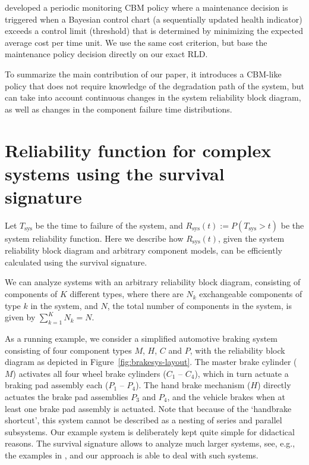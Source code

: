 \documentclass[authoryear]{elsarticle}
\newcommand{\Tsys}{T_\text{sys}}
\newcommand{\Rsys}{R_\text{sys}}
\def\tnow{t_\text{now}}
\newcommand{\Rsysnow}{R^{(t_\text{now})}_\text{sys}}
\begin{document}
\citet{2011:kim-et-al} developed a periodic monitoring CBM policy
where a maintenance decision is triggered when a Bayesian control chart
(a sequentially updated health indicator) exceeds a control limit (threshold)
that is determined by minimizing the expected average cost per time unit.
We use the same cost criterion, but base the maintenance policy decision directly on our exact RLD.

To summarize the main contribution of our paper,
it introduces a CBM-like policy that does not require knowledge of the degradation path of the system,
but can take into account continuous changes in the system reliability block diagram,
as well as changes in the component failure time distributions.



\section{Reliability function for complex systems using the survival signature}
\label{sec:sysrel}

Let $\Tsys$ be the time to failure of the system,
and $\Rsys(t) := P(\Tsys > t)$ be the system reliability function.
Here we describe how $\Rsys(t)$, given the system reliability block diagram and arbitrary component models,
can be efficiently calculated using the survival signature.

We can analyze systems with an arbitrary reliability block diagram,
consisting of components of $K$ different types,
where there are $N_k$ exchangeable components of type $k$ in the system,
and $N$, the total number of components in the system, is given by $\sum_{k=1}^K N_k = N$.

As a running example, we consider a simplified automotive braking system
consisting of four component types $M$, $H$, $C$ and $P$,
with the reliability block diagram as depicted in Figure~\ref{fig:brakesys-layout}.
The master brake cylinder ($M$) activates all four wheel brake cylinders ($C_1$ -- $C_4$),
which in turn actuate a braking pad assembly each ($P_1$ -- $P_4$).
The hand brake mechanism ($H$) directly actuates the brake pad assemblies $P_3$ and $P_4$,
and the vehicle brakes when at least one brake pad assembly is actuated.
Note that because of the `handbrake shortcut', this system cannot be described as a nesting of series and parallel subsystems.
Our example system is deliberately kept quite simple for didactical reasons.
The survival signature allows to analyze much larger systems,
see, e.g., the examples in \citet{2017:reed},
and our approach is able to deal with such systems.
\end{document}
